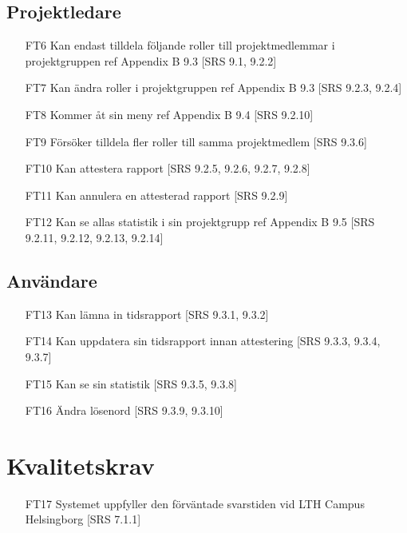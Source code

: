 \documentclass[paper=a4, fontsize=11pt,twoside]{article}
\begin{document}
\subsection{Projektledare}  
\begin{itemize}
\item[FT6] Kan endast tilldela följande roller till projektmedlemmar i projektgruppen ref Appendix B 9.3 [SRS 9.1, 9.2.2]
\item[FT7] Kan ändra roller i projektgruppen ref Appendix B 9.3 [SRS 9.2.3, 9.2.4]
\item[FT8] Kommer åt sin meny ref Appendix B 9.4 [SRS 9.2.10] 
\item[FT9] Försöker tilldela fler roller till samma projektmedlem [SRS 9.3.6] 
\item[FT10] Kan attestera rapport [SRS 9.2.5, 9.2.6, 9.2.7, 9.2.8] 
\item[FT11] Kan annulera en attesterad rapport [SRS 9.2.9] 
\item[FT12] Kan se allas statistik i sin projektgrupp ref Appendix B 9.5 [SRS 9.2.11, 9.2.12, 9.2.13, 9.2.14]
\end{itemize}


\subsection{Användare} 
\begin{itemize}
\item[FT13] Kan lämna in tidsrapport [SRS 9.3.1, 9.3.2] 
\item[FT14] Kan uppdatera sin tidsrapport innan attestering [SRS 9.3.3,
9.3.4, 9.3.7]
\item[FT15] Kan se sin statistik [SRS 9.3.5, 9.3.8] 
\item[FT16] Ändra lösenord [SRS 9.3.9, 9.3.10] 
\end{itemize}

\section{Kvalitetskrav} 
\begin{itemize}
\item[FT17] Systemet uppfyller den förväntade svarstiden vid LTH Campus Helsingborg
[SRS 7.1.1]
\end{itemize}
\end{document}
